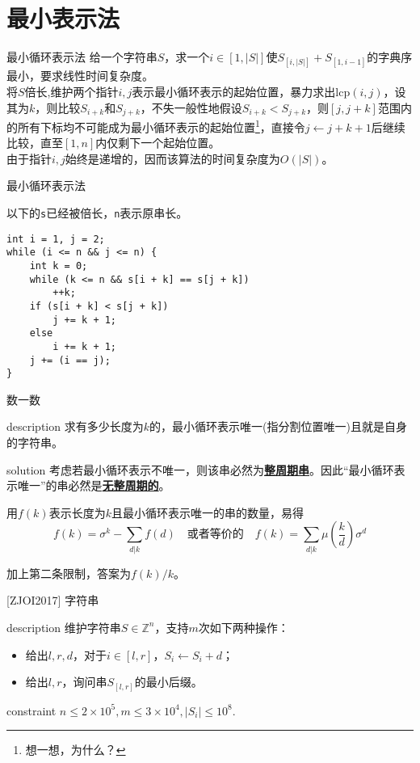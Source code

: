 \documentclass{beamer}
\theoremstyle{compact}
\def\obj#1{\textbf{\uline{#1}}}
\def\le{\leqslant}
\def\lcp{\textrm{lcp}}
\begin{document}
\section{最小表示法}
\begin{frame}{最小循环表示法}
	给一个字符串$S$，求一个$i\in [1, |S|]$使$S_{[i, |S|]}+S_{[1, i-1]}$的字典序最小，要求线性时间复杂度。
	\pause\\
	
	将$S$倍长,维护两个指针$i,j$表示最小循环表示的起始位置，暴力求出$\lcp(i,j)$，设其为$k$，则比较$S_{i+k}$和$S_{j+k}$，不失一般性地假设$S_{i+k}<S_{j+k}$，则$[j,j+k]$范围内的所有下标均不可能成为最小循环表示的起始位置\footnote{\tiny 想一想，为什么？}，直接令$j \gets j+k+1$后继续比较，直至$[1,n]$内仅剩下一个起始位置。
	\\
	
	由于指针$i,j$始终是递增的，因而该算法的时间复杂度为$O(|S|)$。
\end{frame}
\begin{frame}[fragile]{最小循环表示法}
	
	以下的\texttt{s}已经被倍长，\texttt{n}表示原串长。
	
\begin{verbatim}
int i = 1, j = 2;
while (i <= n && j <= n) {
    int k = 0;
    while (k <= n && s[i + k] == s[j + k])
        ++k;
    if (s[i + k] < s[j + k])
        j += k + 1;
    else
        i += k + 1;
    j += (i == j);
}
\end{verbatim}		
\end{frame}
\begin{frame}{数一数}
	\begin{block}{description}
		求有多少长度为$k$的，最小循环表示唯一(指分割位置唯一)且就是自身的字符串。
	\end{block}
	\pause
	\begin{block}{solution}
		考虑若最小循环表示不唯一，则该串必然为\obj{整周期串}。因此“最小循环表示唯一”的串必然是\obj{无整周期的}。

		用$f(k)$表示长度为$k$且最小循环表示唯一的串的数量，易得
		$$f(k) = \sigma^k - \sum_{d | k}f(d) \quad\mbox{或者等价的}\quad f(k) = \sum_{d | k}\mu(\frac kd)\sigma^d$$

		加上第二条限制，答案为$f(k) / k$。
	\end{block}
\end{frame}
\begin{frame}{[ZJOI2017] 字符串}
	\begin{block}{description}
		维护字符串$S \in \mathbb Z^n$，支持$m$次如下两种操作：
		\begin{itemize}
			\item 给出$l, r, d$，对于$i \in [l, r]$，$S_i \gets S_i + d$；
			\item 给出$l, r$，询问串$S_{[l, r]}$的最小后缀。
		\end{itemize}
	\end{block}
	\begin{block}{constraint}
		$n \le 2 \times 10^5, m \le 3 \times 10^4, |S_i| \le 10^8.$
	\end{block}
\end{frame}
\end{document}

